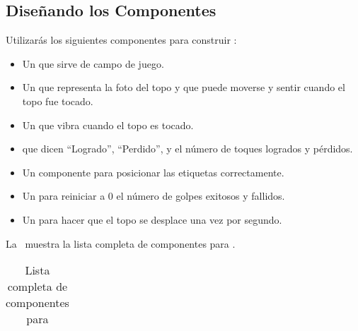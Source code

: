 \subsection*{Diseñando los Componentes}

Utilizarás los siguientes componentes para construir :

\begin{itemize}

\item Un  que sirve de campo de juego.

\item Un  que representa la foto del topo y
  que puede moverse y sentir cuando el topo fue tocado.

\item Un  que vibra cuando el topo es tocado.

  \item {} que dicen ``Logrado'', ``Perdido'', y el
    número de toques logrados y pérdidos.

  \item Un componente  para
    posicionar las etiquetas correctamente.

  \item Un  para reiniciar a 0 el número de golpes
    exitosos y fallidos.

  \item Un  para hacer que el topo se desplace una
    vez por segundo.
\end{itemize}

La~ muestra la lista completa de componentes
para .

\begin{footnotesize}
  \begin{table}[H]
    \centering
    \begin{tabular}{|p{3cm}|c|c|p{3.5cm}|}
      \hline
      \hline
    \end{tabular}
    \caption{Lista completa de componentes para }
    \label{tab:MoleMashTab1}
  \end{table}
\end{footnotesize}

